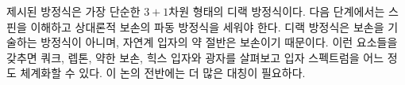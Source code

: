 \begin{classroomqa}
\end{classroomqa}

제시된 방정식은 가장 단순한 \(3+1\)차원 형태의 디랙 방정식이다. 다음 단계에서는 스핀을 이해하고 상대론적 보손의 파동 방정식을 세워야 한다. 디랙 방정식은 보손을 기술하는 방정식이 아니며, 자연계 입자의 약 절반은 보손이기 때문이다. 이런 요소들을 갖추면 쿼크, 렙톤, 약한 보손, 힉스 입자와 광자를 살펴보고 입자 스펙트럼을 어느 정도 체계화할 수 있다. 이 논의 전반에는 더 많은 대칭이 필요하다.
